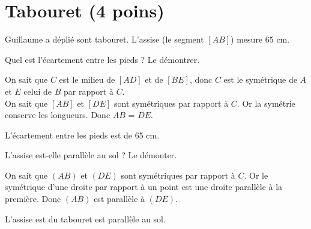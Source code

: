 \section{Tabouret (4 poins)}

\begin{multicols}{2}
	Guillaume a déplié sont tabouret. L'assise (le segment $[AB]$) mesure 65 cm.

\begin{questions}
	\question[2] Quel est l'écartement entre les pieds ? Le démontrer.
	\begin{solution}
		On sait que $C$ est le milieu de $[AD]$ et de $[BE]$, donc $C$ est le symétrique de $A$ et $E$ celui de $B$ par rapport à $C$.\\
		
		On sait que $[AB]$ et $[DE]$ sont symétriques par rapport à $C$.
		Or la symétrie conserve les longueurs.
		Donc $AB$ = $DE$.
		
		L'écartement entre les pieds est de 65 cm.
		
	\end{solution}
	
	\question[2] L'assise est-elle parallèle au sol ? Le démonter.
	
	\begin{solution}
		On sait que $(AB)$ et $(DE)$ sont symétriques par rapport à $C$.
		Or le symétrique d'une droite par rapport à un point est une droite parallèle à la première.
		Donc $(AB)$ est parallèle à $(DE)$.
		
		L'assise est du tabouret est parallèle au sol.
	\end{solution}
\end{questions}


\end{multicols}
